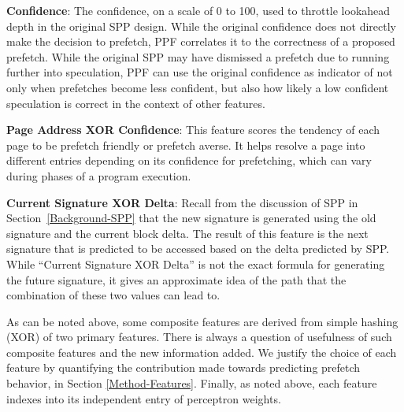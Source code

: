 \noindent \textbf{Confidence}: The confidence, on a scale of 0 to 100,
used to throttle lookahead depth in the original SPP design.  While
the original confidence does not directly make the decision to
prefetch, PPF correlates it to the correctness of a proposed prefetch.
While the original SPP may have dismissed a prefetch due to running
further into speculation, PPF can use the original confidence as
indicator of not only when prefetches become less confident, but also
how likely a low confident speculation is correct in the context of
other features.

\noindent \textbf{Page Address XOR Confidence}: This feature scores
the tendency of each page to be prefetch friendly or prefetch averse.
It helps resolve a page into different entries depending on its
confidence for prefetching, which can vary during phases of a program
execution.

\noindent \textbf{Current Signature XOR Delta}: Recall from the
discussion of SPP in Section~\ref{Background-SPP} that the new
signature is generated using the old signature and the current block
delta.  The result of this feature is the next signature that is
predicted to be accessed based on the delta predicted by SPP. While
``Current Signature XOR Delta'' is not the exact formula for
generating the future signature, it gives an approximate idea of the
path that the combination of these two values can lead to.

As can be noted above, some composite features are derived from simple
hashing (XOR) of two primary features. There is always a question of
usefulness of such composite features and the new information added.
We justify the choice of each feature by quantifying the contribution
made towards predicting prefetch behavior, in Section
\ref{Method-Features}.  Finally, as noted above, each feature indexes
into its independent entry of perceptron weights.
